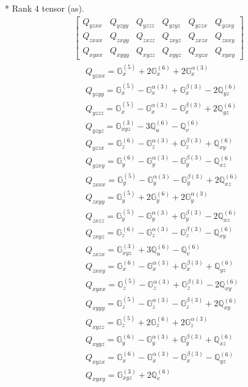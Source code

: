 \documentclass[fleqn,8pt,landscape]{jsarticle}
\begin{document}
* Rank 4 tensor (as).
\begin{align*}
\begin{bmatrix} Q_{yzxx} & Q_{yzyy} & Q_{yzzz} & Q_{yzyz} & Q_{yzzx} & Q_{yzxy} \\ Q_{zxxx} & Q_{zxyy} & Q_{zxzz} & Q_{zxyz} & Q_{zxzx} & Q_{zxxy} \\ Q_{xyxx} & Q_{xyyy} & Q_{xyzz} & Q_{xyyz} & Q_{xyzx} & Q_{xyxy} \end{bmatrix}
\end{align*}
\begin{align*}
& Q_{yzxx} = \mathbb{G}_{x}^{(5)} + 2 \mathbb{G}_{x}^{(6)} + 2 \mathbb{G}_{x}^{\alpha(3)} \\
& Q_{yzyy} = \mathbb{G}_{x}^{(5)} - \mathbb{G}_{x}^{\alpha(3)} + \mathbb{G}_{x}^{\beta(3)} - 2 \mathbb{Q}_{yz}^{(6)} \\
& Q_{yzzz} = \mathbb{G}_{x}^{(5)} - \mathbb{G}_{x}^{\alpha(3)} - \mathbb{G}_{x}^{\beta(3)} + 2 \mathbb{Q}_{yz}^{(6)} \\
& Q_{yzyz} = \mathbb{G}_{xyz}^{(3)} - 3 \mathbb{Q}_{u}^{(6)} - \mathbb{Q}_{v}^{(6)} \\
& Q_{yzzx} = \mathbb{G}_{z}^{(6)} - \mathbb{G}_{z}^{\alpha(3)} + \mathbb{G}_{z}^{\beta(3)} + \mathbb{Q}_{xy}^{(6)} \\
& Q_{yzxy} = \mathbb{G}_{y}^{(6)} - \mathbb{G}_{y}^{\alpha(3)} - \mathbb{G}_{y}^{\beta(3)} - \mathbb{Q}_{xz}^{(6)} \\
& Q_{zxxx} = \mathbb{G}_{y}^{(5)} - \mathbb{G}_{y}^{\alpha(3)} - \mathbb{G}_{y}^{\beta(3)} + 2 \mathbb{Q}_{xz}^{(6)} \\
& Q_{zxyy} = \mathbb{G}_{y}^{(5)} + 2 \mathbb{G}_{y}^{(6)} + 2 \mathbb{G}_{y}^{\alpha(3)} \\
& Q_{zxzz} = \mathbb{G}_{y}^{(5)} - \mathbb{G}_{y}^{\alpha(3)} + \mathbb{G}_{y}^{\beta(3)} - 2 \mathbb{Q}_{xz}^{(6)} \\
& Q_{zxyz} = \mathbb{G}_{z}^{(6)} - \mathbb{G}_{z}^{\alpha(3)} - \mathbb{G}_{z}^{\beta(3)} - \mathbb{Q}_{xy}^{(6)} \\
& Q_{zxzx} = \mathbb{G}_{xyz}^{(3)} + 3 \mathbb{Q}_{u}^{(6)} - \mathbb{Q}_{v}^{(6)} \\
& Q_{zxxy} = \mathbb{G}_{x}^{(6)} - \mathbb{G}_{x}^{\alpha(3)} + \mathbb{G}_{x}^{\beta(3)} + \mathbb{Q}_{yz}^{(6)} \\
& Q_{xyxx} = \mathbb{G}_{z}^{(5)} - \mathbb{G}_{z}^{\alpha(3)} + \mathbb{G}_{z}^{\beta(3)} - 2 \mathbb{Q}_{xy}^{(6)} \\
& Q_{xyyy} = \mathbb{G}_{z}^{(5)} - \mathbb{G}_{z}^{\alpha(3)} - \mathbb{G}_{z}^{\beta(3)} + 2 \mathbb{Q}_{xy}^{(6)} \\
& Q_{xyzz} = \mathbb{G}_{z}^{(5)} + 2 \mathbb{G}_{z}^{(6)} + 2 \mathbb{G}_{z}^{\alpha(3)} \\
& Q_{xyyz} = \mathbb{G}_{y}^{(6)} - \mathbb{G}_{y}^{\alpha(3)} + \mathbb{G}_{y}^{\beta(3)} + \mathbb{Q}_{xz}^{(6)} \\
& Q_{xyzx} = \mathbb{G}_{x}^{(6)} - \mathbb{G}_{x}^{\alpha(3)} - \mathbb{G}_{x}^{\beta(3)} - \mathbb{Q}_{yz}^{(6)} \\
& Q_{xyxy} = \mathbb{G}_{xyz}^{(3)} + 2 \mathbb{Q}_{v}^{(6)}
\end{align*}
\end{document}
